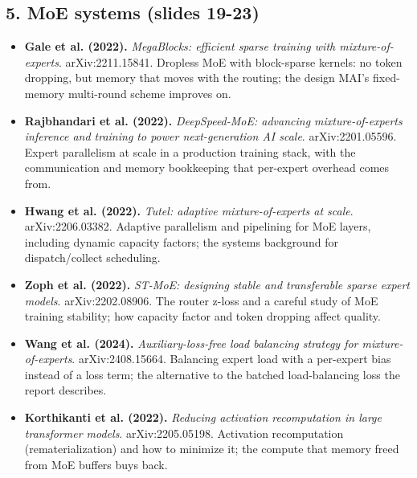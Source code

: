 \documentclass[11pt,letterpaper]{article}
\begin{document}
\subsection*{5. MoE systems (slides 19-23)}
\begin{itemize}[leftmargin=1.2em,itemsep=3pt]\sloppy
\item \textbf{Gale et al. (2022).} \textit{MegaBlocks: efficient sparse training with mixture-of-experts}. arXiv:2211.15841. Dropless MoE with block-sparse kernels: no token dropping, but memory that moves with the routing; the design MAI's fixed-memory multi-round scheme improves on.
\item \textbf{Rajbhandari et al. (2022).} \textit{DeepSpeed-MoE: advancing mixture-of-experts inference and training to power next-generation AI scale}. arXiv:2201.05596. Expert parallelism at scale in a production training stack, with the communication and memory bookkeeping that per-expert overhead comes from.
\item \textbf{Hwang et al. (2022).} \textit{Tutel: adaptive mixture-of-experts at scale}. arXiv:2206.03382. Adaptive parallelism and pipelining for MoE layers, including dynamic capacity factors; the systems background for dispatch/collect scheduling.
\item \textbf{Zoph et al. (2022).} \textit{ST-MoE: designing stable and transferable sparse expert models}. arXiv:2202.08906. The router z-loss and a careful study of MoE training stability; how capacity factor and token dropping affect quality.
\item \textbf{Wang et al. (2024).} \textit{Auxiliary-loss-free load balancing strategy for mixture-of-experts}. arXiv:2408.15664. Balancing expert load with a per-expert bias instead of a loss term; the alternative to the batched load-balancing loss the report describes.
\item \textbf{Korthikanti et al. (2022).} \textit{Reducing activation recomputation in large transformer models}. arXiv:2205.05198. Activation recomputation (rematerialization) and how to minimize it; the compute that memory freed from MoE buffers buys back.
\end{itemize}
\end{document}
